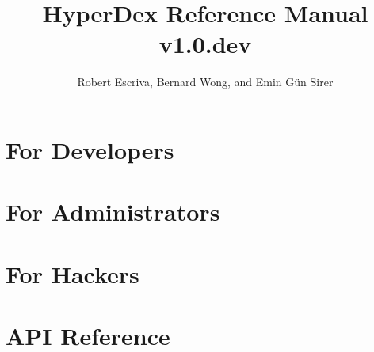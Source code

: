 \documentclass[10pt,oneside]{book}
\title{HyperDex Reference Manual v1.0.dev}
\author{Robert Escriva, Bernard Wong, and Emin G{\"u}n Sirer}
\newcommand*{\topdir}{.}%
\newcommand*{\topdir}{..}%
\begin{document}
\frontmatter
\maketitle
\tableofcontents

\mainmatter




\part{For Developers}
\label{part:for-developers}




%

\part{For Administrators}
\label{part:for-admins}




\part{For Hackers}
\label{part:for-hackers}


\part{API Reference}
\label{part:api-ref}



\backmatter

\clearpage
{}
\printindex

\clearpage
{}


\end{document}
